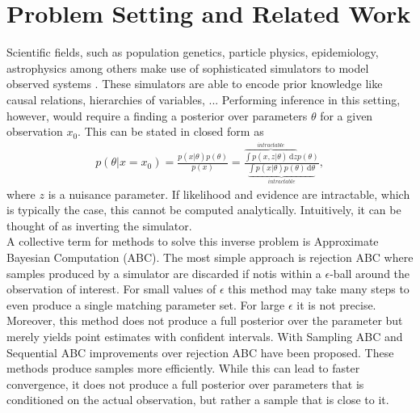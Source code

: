 \documentclass[12pt]{article}
\title{\vskip-3em \bf 
	Simulation-based Inference
    }
\author{
    A Summary Written by Stefan Wezel \\
    \texttt{stefan.wezel@student.uni-tuebingen.de}
}
\date{\it Machine Learning for and with Dynamical Systems\\Summer Term 2021}
\newcommand{\diff}{\,\text{d}}
\begin{document}
\maketitle



\section*{Problem Setting and Related Work}
Scientific fields, such as population genetics, particle physics, epidemiology, astrophysics among others make use of sophisticated simulators to model observed systems \citep{brehmer2020simulation, de2020simulation, delaunoy2020lightning,cranmer2020frontier, pritchard1999population}. These simulators are able to encode prior knowledge like causal relations, hierarchies of variables, ... Performing inference in this setting, however, would require a finding a posterior over parameters $\theta$ for a given observation $x_0$. This can be stated in closed form as 
\begin{align}
	p(\theta|x=x_0) = \frac{p(x|\theta)p(\theta)}{p(x)} = \frac{\overbrace{\int p(x,z|\theta)\diff z}^{intractable} p(\theta)}{\underbrace{\int p(x|\theta)p(\theta) \diff \theta}_{intractable}},
\end{align}
where $z$ is a nuisance parameter. If likelihood and evidence are intractable, which is typically the case, this cannot be computed analytically. Intuitively, it can be thought of as inverting the simulator.\\
A collective term for methods to solve this inverse problem is Approximate Bayesian Computation (ABC). The most simple approach is rejection ABC \citep{pritchard1999population} where samples produced by a simulator are discarded if notis within a $\epsilon$-ball around the observation of interest. For small values of $\epsilon$ this method may take many steps to even produce a single matching parameter set. For large $\epsilon$ it is not precise. Moreover, this method does not produce a full posterior over the parameter but merely yields point estimates with confident intervals. With Sampling ABC \citep{marjoram2003markov} and Sequential ABC \citep{beaumont2009adaptive,bonassi2015sequential} improvements over rejection ABC have been proposed. These methods produce samples more efficiently. While this can lead to faster convergence, it does not produce a full posterior over parameters that is conditioned on the actual observation, but rather a sample that is close to it.
\end{document}
